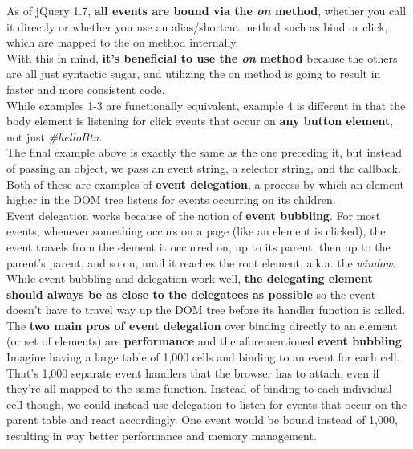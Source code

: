 \documentclass[10pt,letterpaper]{report}
\begin{document}
As of jQuery 1.7, \textbf{all events are bound via the \textit{on} method}, whether you call it directly or whether you use an alias/shortcut method such as bind or click, which are mapped to the on method internally.\\With this in mind, \textbf{it's beneficial to use the \textit{on} method} because the others are all just syntactic sugar, and utilizing the on method is going to result in faster and more consistent code.\\
While examples 1-3 are functionally equivalent, example 4 is different in that the body element is listening for click events that occur on \textbf{any button element}, not just \textit{\#helloBtn}.\\ The final example above is exactly the same as the one preceding it, but instead of passing an object, we pass an event string, a selector string, and the callback. Both of these are examples of \textbf{event delegation}, a process by which an element higher in the DOM tree listens for events occurring on its children.\\
Event delegation works because of the notion of \textbf{event bubbling}. For most events, whenever something occurs on a page (like an element is clicked), the event travels from the element it occurred on, up to its parent, then up to the parent's parent, and so on, until it reaches the root element, a.k.a. the \textit{window}. \\
While event bubbling and delegation work well, \textbf{the delegating element should always be as close to the delegatees as possible} so the event doesn't have to travel way up the DOM tree before its handler function is called.\\
The \textbf{two main pros of event delegation} over binding directly to an element (or set of elements) are \textbf{performance} and the aforementioned \textbf{event bubbling}.\\Imagine having a large table of 1,000 cells and binding to an event for each cell. That's 1,000 separate event handlers that the browser has to attach, even if they're all mapped to the same function. Instead of binding to each individual cell though, we could instead use delegation to listen for events that occur on the parent table and react accordingly. One event would be bound instead of 1,000, resulting in way better performance and memory management.
\end{document}
